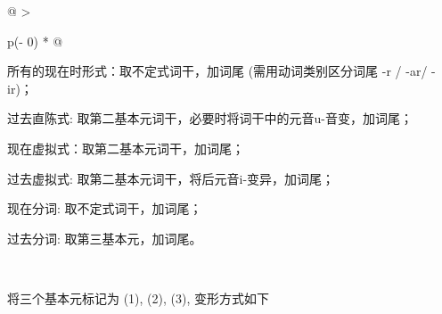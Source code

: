 \begin{longtable}[]{@{}
  >{\raggedright\arraybackslash}p{(\columnwidth - 0\tabcolsep) * }@{}}
  \toprule\noalign{}
  \begin{minipage}[b]{\linewidth}\raggedright
    所有的现在时形式：取不定式词干，加词尾 (需用动词类别区分词尾 -r / -ar/
    -ir)；

    过去直陈式: 取第二基本元词干，必要时将词干中的元音u-音变，加词尾；

    现在虚拟式：取第二基本元词干，加词尾；

    过去虚拟式: 取第二基本元词干，将后元音i-变异，加词尾；

    现在分词: 取不定式词干，加词尾；

    过去分词: 取第三基本元，加词尾。
  \end{minipage} \\
  \midrule\noalign{}
  \endhead
  \bottomrule\noalign{}
  \endlastfoot
\end{longtable}

将三个基本元标记为 (1), (2), (3), 变形方式如下

